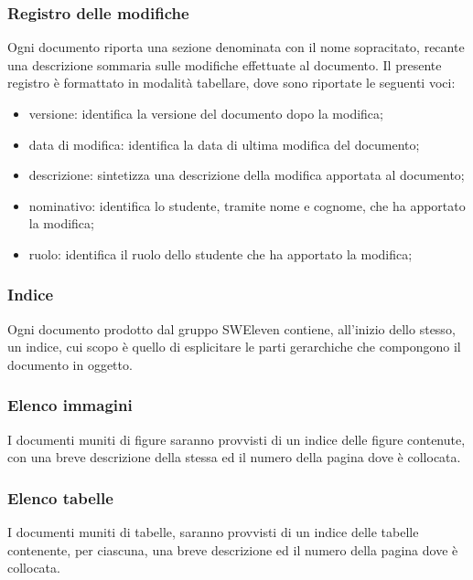 \subsubsection{Registro delle modifiche}
Ogni documento riporta una sezione denominata con il nome sopracitato, recante una descrizione sommaria sulle modifiche effettuate al documento. Il presente registro è formattato in modalità tabellare, dove sono riportate le seguenti voci:	
\begin{itemize}
	\item versione: identifica la versione del documento dopo la modifica;
	\item data di modifica: identifica la data di ultima modifica del documento;
	\item descrizione: sintetizza una descrizione della modifica apportata al documento;
	\item nominativo: identifica lo studente, tramite nome e cognome, che ha apportato la modifica;
	\item ruolo: identifica il ruolo dello studente che ha apportato la modifica;
\end{itemize}

\subsubsection{Indice}
Ogni documento prodotto dal gruppo SWEleven contiene, all’inizio dello stesso, un indice, cui scopo è quello di esplicitare le parti gerarchiche che compongono il documento in oggetto. 

\subsubsection{Elenco immagini}
I documenti muniti di figure saranno provvisti di un indice delle figure contenute, con una breve descrizione della stessa ed il numero della pagina dove è collocata.

\subsubsection{Elenco tabelle}
I documenti muniti di tabelle, saranno provvisti di un indice delle tabelle contenente, per
ciascuna, una breve descrizione ed il numero della pagina dove è collocata.

